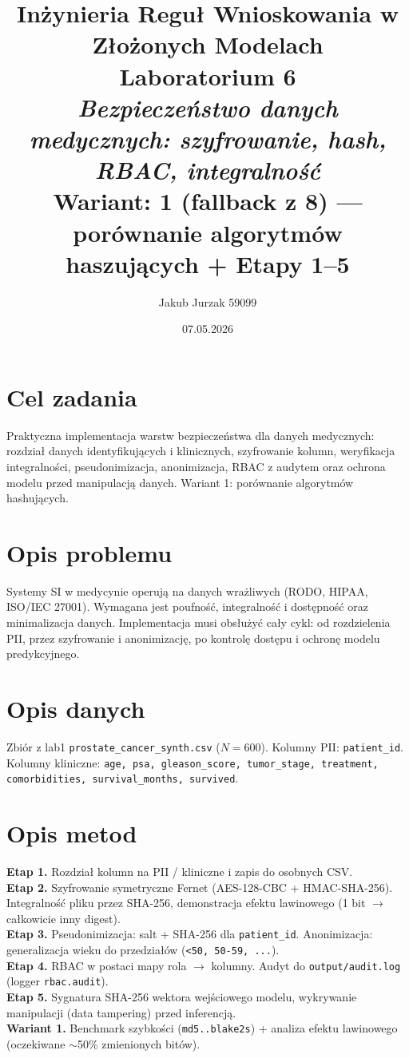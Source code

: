 \documentclass[12pt,a4paper]{article}
\title{
  \vspace{2cm}
  \LARGE\textbf{Inżynieria Reguł Wnioskowania w Złożonych Modelach}\\[0.6cm]
  \Large Laboratorium 6\\[0.4cm]
  \large \textit{Bezpieczeństwo danych medycznych: szyfrowanie, hash, RBAC, integralność}\\[0.3cm]
  \normalsize Wariant: \textbf{1 (fallback z 8) — porównanie algorytmów haszujących + Etapy 1--5}
}
\author{Jakub Jurzak 59099}
\date{07.05.2026}
\begin{document}
\maketitle
\thispagestyle{empty}
\newpage

\tableofcontents
\newpage

\section{Cel zadania}
Praktyczna implementacja warstw bezpieczeństwa dla danych medycznych: rozdział danych identyfikujących i klinicznych, szyfrowanie kolumn, weryfikacja integralności, pseudonimizacja, anonimizacja, RBAC z audytem oraz ochrona modelu przed manipulacją danych. Wariant 1: porównanie algorytmów hashujących.

\section{Opis problemu}
Systemy SI w medycynie operują na danych wrażliwych (RODO, HIPAA, ISO/IEC 27001). Wymagana jest poufność, integralność i dostępność oraz minimalizacja danych. Implementacja musi obsłużyć cały cykl: od rozdzielenia PII, przez szyfrowanie i anonimizację, po kontrolę dostępu i ochronę modelu predykcyjnego.

\section{Opis danych}
Zbiór z lab1 \texttt{prostate\_cancer\_synth.csv} ($N=600$). Kolumny PII: \texttt{patient\_id}. Kolumny kliniczne: \texttt{age, psa, gleason\_score, tumor\_stage, treatment, comorbidities, survival\_months, survived}.

\section{Opis metod}
\textbf{Etap 1.} Rozdział kolumn na PII / kliniczne i zapis do osobnych CSV.\\\textbf{Etap 2.} Szyfrowanie symetryczne Fernet (AES-128-CBC + HMAC-SHA-256). Integralność pliku przez SHA-256, demonstracja efektu lawinowego (1 bit $\to$ całkowicie inny digest).\\\textbf{Etap 3.} Pseudonimizacja: salt + SHA-256 dla \texttt{patient\_id}. Anonimizacja: generalizacja wieku do przedziałów (\texttt{<50, 50-59, ...}).\\\textbf{Etap 4.} RBAC w postaci mapy rola $\to$ kolumny. Audyt do \texttt{output/audit.log} (logger \texttt{rbac.audit}).\\\textbf{Etap 5.} Sygnatura SHA-256 wektora wejściowego modelu, wykrywanie manipulacji (data tampering) przed inferencją.\\\textbf{Wariant 1.} Benchmark szybkości (\texttt{md5..blake2s}) + analiza efektu lawinowego (oczekiwane $\sim$50\% zmienionych bitów).
\end{document}
